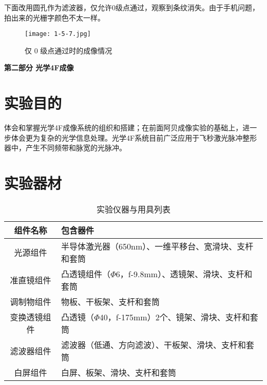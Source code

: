\documentclass[12pt]{article}
\begin{document}
下面改用圆孔作为滤波器，仅允许0级点通过，观察到条纹消失。由于手机问题，拍出来的光栅字颜色不太一样。

\begin{figure}[h!]
    \centering
    \texttt{[image: 1-5-7.jpg]}
    \caption{仅 0 级点通过时的成像情况}
\end{figure}

\newpage


\begin{center}
    {\Large \textbf{第二部分 \quad 光学4F成像}}
\end{center}

\setcounter{section}{0}
\section{实验目的}
体会和掌握光学4F成像系统的组织和搭建；在前面阿贝成像实验的基础上，进一步体会更为复杂的光学信息处理。光学4F系统目前广泛应用于飞秒激光脉冲整形器中，产生不同频带和脉宽的光脉冲。

\section{实验器材}
\begin{table}[htbp]
    \centering
    \begin{tabular}[pos]{|c|l|}
        \hline
        组件名称 & 包含器件 \\
        \hline
        光源组件 & 半导体激光器（650nm）、一维平移台、宽滑块、支杆和套筒 \\
        \hline
        准直镜组件 & 凸透镜组件（$\Phi$6，f-9.8mm）、透镜架、滑块、支杆和套筒 \\
        \hline
        调制物组件 & 物板、干板架、支杆和套筒 \\
        \hline
        变换透镜组件 & 凸透镜（$\Phi$40，f-175mm）2个、镜架、滑块、支杆和套筒 \\
        \hline
        滤波器组件 & 滤波器（低通、方向滤波）、干板架、滑块、支杆和套筒 \\
        \hline
        白屏组件 & 白屏、板架、滑块、支杆和套筒 \\
        \hline
    \end{tabular}
    \caption{实验仪器与用具列表}
\end{table}
\end{document}
